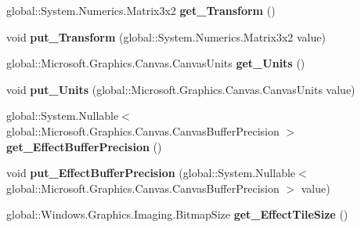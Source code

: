\begin{DoxyCompactItemize}
global\+::\+System.\+Numerics.\+Matrix3x2 {\bfseries get\+\_\+\+Transform} ()
\item 
\mbox{\label{interface_microsoft_1_1_graphics_1_1_canvas_1_1_i_canvas_drawing_session_af2b5485855526d609a881dabe07b65e8}} 
void {\bfseries put\+\_\+\+Transform} (global\+::\+System.\+Numerics.\+Matrix3x2 value)
\item 
\mbox{\label{interface_microsoft_1_1_graphics_1_1_canvas_1_1_i_canvas_drawing_session_a6137a24e6d4c06b3b287662d213228aa}} 
global\+::\+Microsoft.\+Graphics.\+Canvas.\+Canvas\+Units {\bfseries get\+\_\+\+Units} ()
\item 
\mbox{\label{interface_microsoft_1_1_graphics_1_1_canvas_1_1_i_canvas_drawing_session_a1910a6196e05633ca23601d76333d316}} 
void {\bfseries put\+\_\+\+Units} (global\+::\+Microsoft.\+Graphics.\+Canvas.\+Canvas\+Units value)
\item 
\mbox{\label{interface_microsoft_1_1_graphics_1_1_canvas_1_1_i_canvas_drawing_session_af23d6053469a4364d9c8c27e7377c289}} 
global\+::\+System.\+Nullable$<$ global\+::\+Microsoft.\+Graphics.\+Canvas.\+Canvas\+Buffer\+Precision $>$ {\bfseries get\+\_\+\+Effect\+Buffer\+Precision} ()
\item 
\mbox{\label{interface_microsoft_1_1_graphics_1_1_canvas_1_1_i_canvas_drawing_session_a0750c7ecd4686f6086a55c2d26d83532}} 
void {\bfseries put\+\_\+\+Effect\+Buffer\+Precision} (global\+::\+System.\+Nullable$<$ global\+::\+Microsoft.\+Graphics.\+Canvas.\+Canvas\+Buffer\+Precision $>$ value)
\item 
\mbox{\label{interface_microsoft_1_1_graphics_1_1_canvas_1_1_i_canvas_drawing_session_af9496956d42a3cfccf103766bd55a411}} 
global\+::\+Windows.\+Graphics.\+Imaging.\+Bitmap\+Size {\bfseries get\+\_\+\+Effect\+Tile\+Size} ()
\item 
\mbox{\label{interface_microsoft_1_1_graphics_1_1_canvas_1_1_i_canvas_drawing_session_a4c45f8e3daf366e71487f64ae934e755}} 

\end{DoxyCompactItemize}

